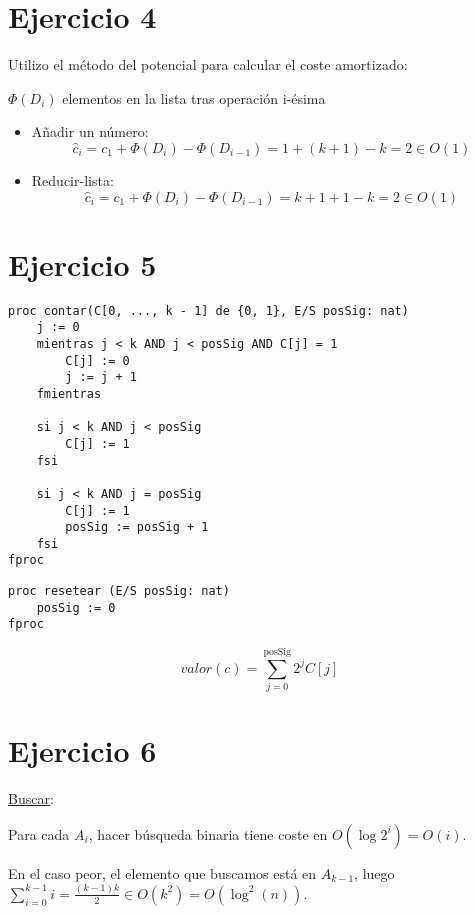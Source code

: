 \documentclass[10pt,a4paper,openright]{book}
\theoremstyle{break}
\begin{document}
\section{Ejercicio 4}%
\label{sec:ejercicio_4}
Utilizo el método del potencial para calcular el coste amortizado: 

$\Phi \left( D_i \right)$ elementos en la lista tras operación i-ésima
\begin{itemize}
    \item Añadir un número: 
    \[
    \hat{c}_i = c_1 + \Phi\left( D_i \right) - \Phi\left( D_{i-1} \right) = 1 + \left( k + 1 \right) - k = 2 \in O\left( 1 \right)
    \]
    \item Reducir-lista: 
    \[
    \hat{c}_i = c_1 + \Phi\left( D_i \right) - \Phi\left( D_{i-1} \right) = k + 1 + 1 - k = 2 \in O\left( 1 \right)
    \]
\end{itemize}

\section{Ejercicio 5}%
\label{sec:ejercicio_5}
\begin{lstlisting}
proc contar(C[0, ..., k - 1] de {0, 1}, E/S posSig: nat)
    j := 0
    mientras j < k AND j < posSig AND C[j] = 1
        C[j] := 0
        j := j + 1
    fmientras

    si j < k AND j < posSig
        C[j] := 1
    fsi

    si j < k AND j = posSig
        C[j] := 1
        posSig := posSig + 1
    fsi
fproc
\end{lstlisting}

\begin{lstlisting}
proc resetear (E/S posSig: nat)
    posSig := 0
fproc
\end{lstlisting}
\[
valor\left( c \right) = \sum_{j=0}^{\text{posSig}} 2^jC\left[ j \right]  
\]

\section{Ejercicio 6}%
\label{sec:ejercicio_6}
\underline{Buscar}:

Para cada $A_i$, hacer búsqueda binaria tiene coste en $O\left( \log 2^i \right) = O\left( i \right)$. 

En el caso peor, el elemento que buscamos está en $A_{k-1}$, luego $\sum_{i=0}^{k-1} i = \frac{\left( k-1 \right) k}{2} \in O\left( k^2 \right) = O\left( \log^2\left( n \right) \right)$.
\end{document}
